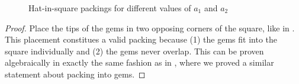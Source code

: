 \documentclass[a4paper,style=print,oneside,bibliography=totoc,nexus,lnum,extramargin]{tubsbook}
\begin{document}
\begin{figure}

    \vspace{5mm}


    \caption{Hat-in-square packings for different values of $a_1$ and $a_2$}
    \label{fig:gems-in-square}
\end{figure}

\begin{proof}
    Place the tips of the gems in two opposing corners of the square, like in .
    This placement constitues a valid packing because (1) the gems fit into the square individually and (2) the gems never overlap. This can be proven algebraically in exactly the same fashion as in , where we proved a similar statement about packing into gems.






\end{proof}
\end{document}
